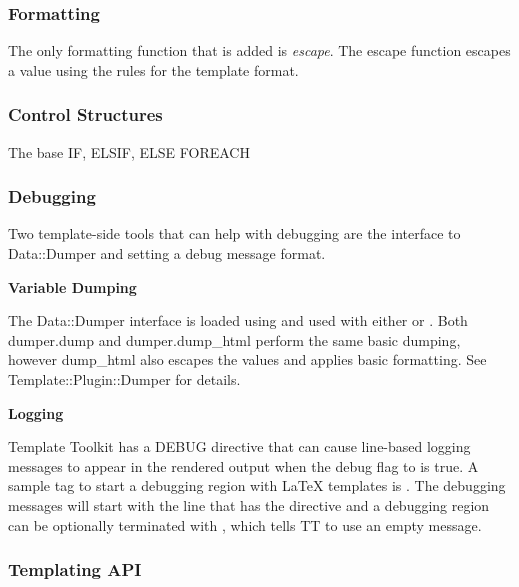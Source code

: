 
\subsubsection{Formatting}
\label{subsec-company-config-templates-formatting}

The only formatting function that is added is \emph{escape}.  The escape
function escapes a value using the rules for the template format.

\subsubsection{Control Structures}
\label{subsec-company-config-templates-control}

The base 
IF, ELSIF, ELSE
FOREACH

\subsubsection{Debugging}
\label{subsec-company-config-templates-debugging}

Two template-side tools that can help with debugging are the interface to
Data::Dumper and setting a debug message format.

\textbf{Variable Dumping}

The Data::Dumper interface is loaded using  and used with
either  or .
Both dumper.dump and dumper.dump\_html perform the same basic dumping, however
dump\_html also escapes the values and applies basic formatting.  See
Template::Plugin::Dumper for details.

\textbf{Logging}

Template Toolkit has a DEBUG directive that can cause line-based logging
messages to appear in the rendered output when the debug flag to \lsmbt{ }is
true.   A sample tag to start a debugging region with \LaTeX{ }templates is
.  The debugging messages will
start with the line that has the directive and a debugging region can be
optionally terminated with , which tells TT to use an
empty message.

\subsubsection{Templating API}
\label{subsec-company-config-templates-api}

